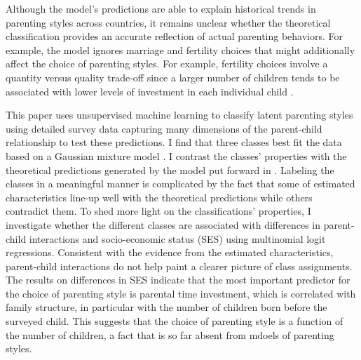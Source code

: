 Although the model's predictions are able to explain historical trends in parenting styles across countries, it remains unclear whether the theoretical classification provides an accurate reflection of actual parenting behaviors. For example, the model ignores marriage and fertility choices that might additionally affect the choice of parenting styles. For example, fertility choices involve a quantity versus quality trade-off since a larger number of children tends to be associated with lower levels of investment in each individual child \textcite{beckerTreatiseFamily1981}.

This paper uses unsupervised machine learning to classify latent parenting styles using detailed survey data capturing many dimensions of the parent-child relationship to test these predictions. I find that three classes best fit the data based on a Gaussian mixture model \parencite[e.g.][]{hastieElementsStatisticalLearning2009}. I contrast the classes' properties with the theoretical predictions generated by the model put forward in \textcite{doepkeParentingStyleAltruism2017}. Labeling the classes in a meaningful manner is complicated by the fact that some of estimated characteristics line-up well with the theoretical predictions while others contradict them. To shed more light on the classifications' properties, I investigate whether the different classes are associated with differences in parent-child interactions and socio-economic status (SES) using multinomial logit regressions. Consistent with the evidence from the estimated characteristics,  parent-child interactions do not help paint a clearer picture of class assignments. The results on differences in SES indicate that the most important predictor for the choice of parenting style is parental time investment, which is correlated with family structure, in particular with the number of children born before the surveyed child. This suggests that the choice of parenting style is a function of the number of children, a fact that is so far absent from mdoels of parenting styles.


